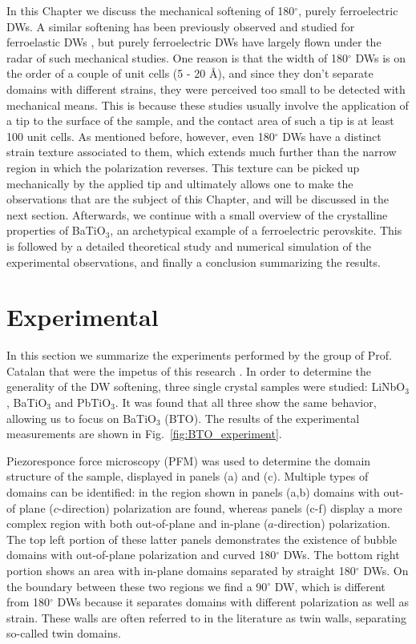 In this Chapter we discuss the mechanical softening of 180$^\circ$, purely ferroelectric DWs.
A similar softening has been previously observed and studied for ferroelastic DWs \cite{Lee2003,Scott2012}, but purely ferroelectric DWs have largely flown under the radar of such mechanical studies.
One reason is that the width of 180$^\circ$ DWs is on the order of a couple of unit cells (5 - 20 \AA \cite{Zhirnov1959}), and since they don't separate domains with different strains, they were perceived too small to be detected with mechanical means.
This is because these studies usually involve the application of a tip to the surface of the sample, and the contact area of such a tip is at least 100 unit cells.
As mentioned before, however, even 180$^\circ$ DWs have a distinct strain texture associated to them, which extends much further than the narrow region in which the polarization reverses.
This texture can be picked up mechanically by the applied tip and ultimately allows one to make the observations that are the subject of this Chapter, and will be discussed in the next section.
Afterwards, we continue with a small overview of the crystalline properties of BaTiO$_3$, an archetypical example of a ferroelectric perovskite.
This is followed by a detailed theoretical study and numerical simulation of the experimental observations, and finally a conclusion summarizing the results.

\section{Experimental}
In this section we summarize the experiments performed by the group of Prof. Catalan that were the impetus of this research \cite{Stefani2020}.
In order to determine the generality of the DW softening, three single crystal samples were studied: LiNbO$_3$, BaTiO$_3$ and PbTiO$_3$. It was found that all three show the same behavior, allowing us to focus on BaTiO$_3$ (BTO).
The results of the experimental measurements are shown in Fig.~\ref{fig:BTO_experiment}.

Piezoresponce force microscopy (PFM)\cite{Harnagea2001} was used to determine the domain structure of the sample, displayed in panels (a) and (c).
Multiple types of domains can be identified: in the region shown in panels (a,b) domains with out-of plane ($c$-direction) polarization are found, whereas panels (c-f) display a more complex region with both out-of-plane and in-plane ($a$-direction) polarization.
The top left portion of these latter panels demonstrates the existence of bubble domains with out-of-plane polarization and curved 180$^\circ$ DWs.
The bottom right portion shows an area with in-plane domains separated by straight 180$^\circ$ DWs.
On the boundary between these two regions we find a 90$^\circ$ DW, which is different from 180$^\circ$ DWs because it separates domains with different polarization as well as strain.
These walls are often referred to in the literature as twin walls, separating so-called twin domains. 

